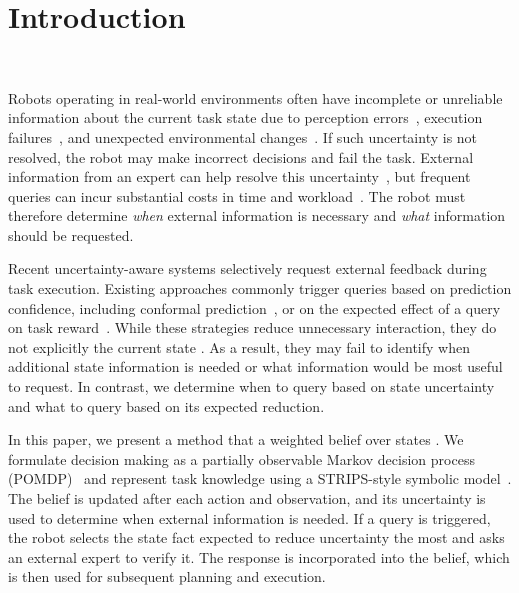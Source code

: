 \section{Introduction}~\label{intro}

Robots operating in real-world environments often have incomplete or unreliable information about the current task state due to perception errors~\cite{kaipa2016addressing}, execution failures~\cite{kaelbling1998planning}, and unexpected environmental changes~\cite{kurniawati2016online}. If such uncertainty is not resolved, the robot may make incorrect decisions and fail the task. External information from an expert can help resolve this uncertainty~\cite{dragan2013legibility, goodrich2008human}, but frequent queries can incur substantial costs in time and workload~\cite{chen2014human}. The robot must therefore determine \textit{when} external information is necessary and \textit{what} information should be requested.

Recent uncertainty-aware systems selectively request external feedback during task execution. Existing approaches commonly trigger queries based on prediction confidence, including conformal prediction~\cite{ren2023robots, liang2024introspective, mullen2025lbap}, or on the expected effect of a query on task reward~\cite{burks2021collaborative, anand2025adaptive}. While these strategies reduce unnecessary interaction, they do not explicitly  the current  state . As a result, they may fail to identify when additional state information is needed or what information would be most useful to request. In contrast, we determine when to query based on state uncertainty and what to query based on its expected reduction.

In this paper, we present a method that  a weighted belief over  states . We formulate decision making as a partially observable Markov decision process (POMDP)~\cite{kaelbling1998planning} and represent task knowledge using a STRIPS-style symbolic model~\cite{davis1993knowledge,fikes1971strips}. The belief is updated after each action and observation, and its uncertainty is used to determine when external information is needed. If a query is triggered, the robot selects the state fact expected to reduce uncertainty the most and asks an external expert to verify it. The response is incorporated into the belief, which is then used for subsequent planning and execution.


